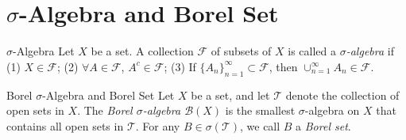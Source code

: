 \section{$\sigma$-Algebra and Borel Set}

\begin{definition}{$\sigma$-Algebra}{}
  Let $X$ be a set. A collection $\mathcal{F}$ of subsets of $X$ is called a
  \emph{$\sigma$-algebra} if
  (1) $X \in \mathcal{F}$;
  (2) $\forall A \in \mathcal{F}$, $A^c \in \mathcal{F}$;
  (3) If $\{A_n\}_{n=1}^{\infty} \subset \mathcal{F}$, then $\cup _{n = 1}^{\infty} A_n \in \mathcal{F}$.
\end{definition}

\begin{definition}{Borel $\sigma$-Algebra and Borel Set}{}
  Let $X$ be a set,
  and let $\mathcal{T}$ denote the collection of open sets in $X$.
  The \emph{Borel $\sigma$-algebra $\mathcal{B}(X)$} is the smallest $\sigma$-algebra
  on $X$ that contains all open sets in $\mathcal{T}$.
  For any $B \in \sigma(\mathcal{T})$,
  we call $B$ a \emph{Borel set}.
\end{definition}




